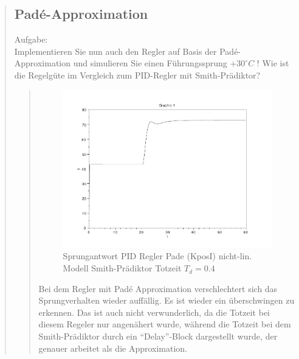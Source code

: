 \begin{quote}
\begin{quote}
    \end{quote}
    
    
    \subsection{Pad\'e-Approximation}
    Aufgabe:\\
    Implementieren Sie nun auch den Regler auf Basis der Pad\'e-Approximation und simulieren Sie einen Führungssprung
    $+30^{\circ} C$ ! Wie ist die Regelgüte im Vergleich zum PID-Regler mit Smith-Prädiktor?\vspace{1em}
    
    
    \begin{quote}
        \begin{figure}[H]
        \centering
            \includegraphics[scale=0.7, trim = 0cm 0cm 0cm 0cm, clip]{./Bilder/4_4_Td_04}
                \caption{Sprungantwort PID Regler Pade (KposI) nicht-lin. Modell Smith-Prädiktor Totzeit $T_d = 0.4$}
        \end{figure}
        
        Bei dem Regler mit Pad\'e Approximation verschlechtert sich das Sprungverhalten wieder auffällig. Es ist wieder
        ein überschwingen zu erkennen. Das ist auch nicht verwunderlich, da die Totzeit bei diesem Regeler nur
        angenähert wurde, während die Totzeit bei dem Smith-Prädiktor durch ein ``Delay''-Block dargestellt wurde, der
        genauer arbeitet als die Approximation.
        
    \end{quote}
    

\end{quote}
